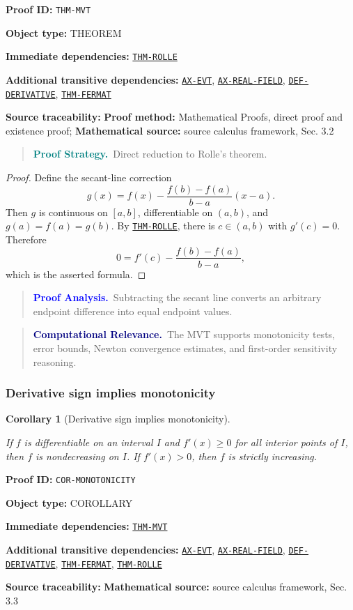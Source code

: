 \documentclass[10pt]{article}
\newcommand{\pidraw}[1]{\begingroup\urlstyle{tt}\nolinkurl{#1}\endgroup}
\newcommand{\pidref}[1]{\hyperref[prf:#1]{\pidraw{#1}}}
\newcommand{\pid}[1]{\pidref{#1}}
\newtheorem{corollary}[theorem]{Corollary}
\theoremstyle{definition}
\theoremstyle{remark}
\newenvironment{proofstrategy}
{\begin{quote}\small\noindent\textbf{\textcolor{teal}{Proof Strategy.}}\ }
{\end{quote}}
\newenvironment{proofanalysis}
{\begin{quote}\small\noindent\textbf{\textcolor{blue}{Proof Analysis.}}\ }
{\end{quote}}
\newenvironment{computationalrelevance}
{\begin{quote}\small\noindent\textbf{\textcolor{navy}{Computational Relevance.}}\ }
{\end{quote}}
\newcommand{\meta}[2]{\noindent\textbf{#1:} #2\par}
\begin{document}
\meta{Proof ID}{\pidraw{THM-MVT}}
\meta{Object type}{THEOREM}
\meta{Immediate dependencies}{\pidref{THM-ROLLE}}
\meta{Additional transitive dependencies}{\pidref{AX-EVT}, \pidref{AX-REAL-FIELD}, \pidref{DEF-DERIVATIVE}, \pidref{THM-FERMAT}}
\meta{Source traceability}{\textbf{Proof method:} Mathematical Proofs, direct proof and existence proof; \textbf{Mathematical source:} source calculus framework, Sec. 3.2}

\begin{proofstrategy}Direct reduction to Rolle's theorem.\end{proofstrategy}

\begin{proof}

Define the secant-line correction
\[
g(x)=f(x)-\frac{f(b)-f(a)}{b-a}(x-a).
\]
Then $g$ is continuous on $[a,b]$, differentiable on $(a,b)$, and
$g(a)=f(a)=g(b)$. By \pid{THM-ROLLE}, there is $c\in(a,b)$ with $g'(c)=0$.
Therefore
\[
0=f'(c)-\frac{f(b)-f(a)}{b-a},
\]
which is the asserted formula.

\end{proof}

\begin{proofanalysis}Subtracting the secant line converts an arbitrary endpoint difference into equal endpoint values.\end{proofanalysis}

\begin{computationalrelevance}The MVT supports monotonicity tests, error bounds, Newton convergence estimates, and first-order sensitivity reasoning.\end{computationalrelevance}

\subsubsection{Derivative sign implies monotonicity}

\begin{corollary}[Derivative sign implies monotonicity]\label{prf:COR-MONOTONICITY}

If $f$ is differentiable on an interval $I$ and $f'(x)\ge0$ for all interior points of $I$, then $f$ is nondecreasing on $I$. If $f'(x)>0$, then $f$ is strictly increasing.

\end{corollary}

\meta{Proof ID}{\pidraw{COR-MONOTONICITY}}
\meta{Object type}{COROLLARY}
\meta{Immediate dependencies}{\pidref{THM-MVT}}
\meta{Additional transitive dependencies}{\pidref{AX-EVT}, \pidref{AX-REAL-FIELD}, \pidref{DEF-DERIVATIVE}, \pidref{THM-FERMAT}, \pidref{THM-ROLLE}}
\meta{Source traceability}{\textbf{Mathematical source:} source calculus framework, Sec. 3.3}
\end{document}
